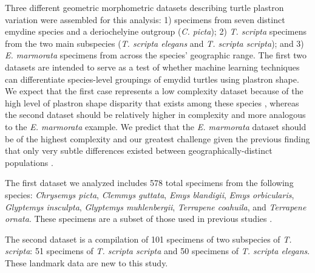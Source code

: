 \documentclass[10pt,letterpaper]{article}
\begin{document}
Three different geometric morphometric datasets describing turtle plastron variation were assembled for this analysis: 1) specimens from seven distinct emydine species and a deriochelyine outgroup (\textit{C. picta}); 2) \textit{T. scripta} specimens from the two main subspecies (\textit{T. scripta elegans} and \textit{T. scripta scripta}); and 3) \textit{E. marmorata} specimens from across the species' geographic range. The first two datasets are intended to serve as a test of whether machine learning techniques can differentiate species-level groupings of emydid turtles using plastron shape. We expect that the first case represents a low complexity dataset because of the high level of plastron shape disparity that exists among these species \cite{Claude2003a,Claude2006,Angielczyk2011}, whereas the second dataset should be relatively higher in complexity and more analogous to the \textit{E. marmorata} example. We predict that the \textit{E. marmorata} dataset should be of the highest complexity and our greatest challenge given the previous finding that only very subtle differences existed between geographically-distinct populations \cite{Holland1992}.

The first dataset we analyzed includes 578 total specimens from the following species: \textit{Chrysemys picta}, \textit{Clemmys guttata}, \textit{Emys blandigii}, \textit{Emys orbicularis}, \textit{Glyptemys insculpta}, \textit{Glyptemys muhlenbergii}, \textit{Terrapene coahuila}, and \textit{Terrapene ornata}. These specimens are a subset of those used in previous studies \cite{Angielczyk2011,Angielczyk2013a}.

The second dataset is a compilation of 101 specimens of two subspecies of \textit{T. scripta}: 51 specimens of \textit{T. scripta scripta} and 50 specimens of \textit{T. scripta elegans}. These landmark data are new to this study. 
\end{document}
